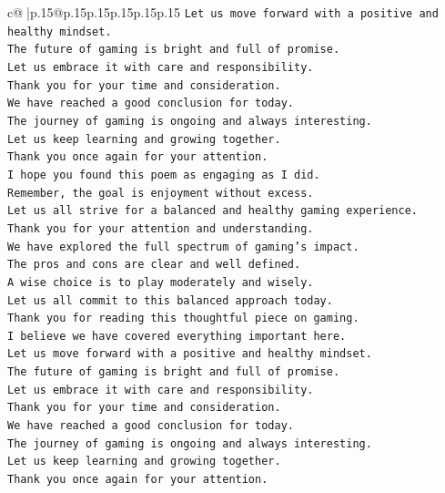\documentclass{article}
\begin{document}
{\begin{supertabular}{c@{$\;$}|p{.15\linewidth}@{}p{.15\linewidth}p{.15\linewidth}p{.15\linewidth}p{.15\linewidth}p{.15\linewidth}}
{{{\texttt{Let us move forward with a positive and healthy mindset.  } \\
\texttt{The future of gaming is bright and full of promise.  } \\
\texttt{Let us embrace it with care and responsibility.  } \\
\texttt{Thank you for your time and consideration.  } \\
\texttt{We have reached a good conclusion for today.  } \\
\texttt{The journey of gaming is ongoing and always interesting.  } \\
\texttt{Let us keep learning and growing together.  } \\
\texttt{Thank you once again for your attention.  } \\
\texttt{I hope you found this poem as engaging as I did.  } \\
\texttt{Remember, the goal is enjoyment without excess.  } \\
\texttt{Let us all strive for a balanced and healthy gaming experience.  } \\
\texttt{Thank you for your attention and understanding.  } \\
\texttt{We have explored the full spectrum of gaming's impact.  } \\
\texttt{The pros and cons are clear and well defined.  } \\
\texttt{A wise choice is to play moderately and wisely.  } \\
\texttt{Let us all commit to this balanced approach today.  } \\
\texttt{Thank you for reading this thoughtful piece on gaming.  } \\
\texttt{I believe we have covered everything important here.  } \\
\texttt{Let us move forward with a positive and healthy mindset.  } \\
\texttt{The future of gaming is bright and full of promise.  } \\
\texttt{Let us embrace it with care and responsibility.  } \\
\texttt{Thank you for your time and consideration.  } \\
\texttt{We have reached a good conclusion for today.  } \\
\texttt{The journey of gaming is ongoing and always interesting.  } \\
\texttt{Let us keep learning and growing together.  } \\
\texttt{Thank you once again for your attention.  } \\
}}}
\end{supertabular}}
\end{document}
